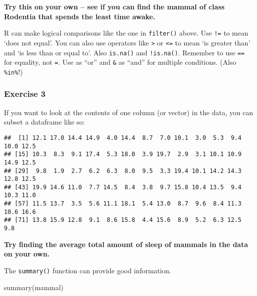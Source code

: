 \documentclass[]{article}
\newenvironment{Shaded}{\begin{snugshade}}{\end{snugshade}}
\newcommand{\FunctionTok}[1]{\textcolor[rgb]{0.00,0.00,0.00}{#1}}
\newcommand{\NormalTok}[1]{#1}
\newcommand{\SpecialCharTok}[1]{\textcolor[rgb]{0.00,0.00,0.00}{#1}}
\begin{document}
\textbf{Try this on your own -- see if you can find the mammal of class
Rodentia that spends the least time awake.}

R can make logical comparisons like the one in \texttt{filter()} above.
Use \texttt{!=} to mean `does not equal'. You can also use operators
like \texttt{\textgreater{}} or \texttt{\textless{}=} to mean `is
greater than' and `is less than or equal to'. Also \texttt{is.na()} and
\texttt{!is.na()}. Remember to use \texttt{==} for equality, not
\texttt{=}. Use \texttt{\textbar{}} as ``or'' and \texttt{\&} as ``and''
for multiple conditions. (Also \texttt{\%in\%}!)

\hypertarget{exercise-3}{%
\subsubsection{Exercise 3}\label{exercise-3}}

If you want to look at the contents of one column (or vector) in the
data, you can subset a dataframe like so:

\begin{Shaded}
\end{Shaded}

\begin{verbatim}
##  [1] 12.1 17.0 14.4 14.9  4.0 14.4  8.7  7.0 10.1  3.0  5.3  9.4 10.0 12.5
## [15] 10.3  8.3  9.1 17.4  5.3 18.0  3.9 19.7  2.9  3.1 10.1 10.9 14.9 12.5
## [29]  9.8  1.9  2.7  6.2  6.3  8.0  9.5  3.3 19.4 10.1 14.2 14.3 12.8 12.5
## [43] 19.9 14.6 11.0  7.7 14.5  8.4  3.8  9.7 15.8 10.4 13.5  9.4 10.3 11.0
## [57] 11.5 13.7  3.5  5.6 11.1 18.1  5.4 13.0  8.7  9.6  8.4 11.3 10.6 16.6
## [71] 13.8 15.9 12.8  9.1  8.6 15.8  4.4 15.6  8.9  5.2  6.3 12.5  9.8
\end{verbatim}

\textbf{Try finding the average total amount of sleep of mammals in the
data on your own.}

The \texttt{summary()} function can provide good information.

\begin{Shaded}
\begin{Highlighting}[]
\FunctionTok{summary}\NormalTok{(mammal)}
\end{Highlighting}
\end{Shaded}
\end{document}
